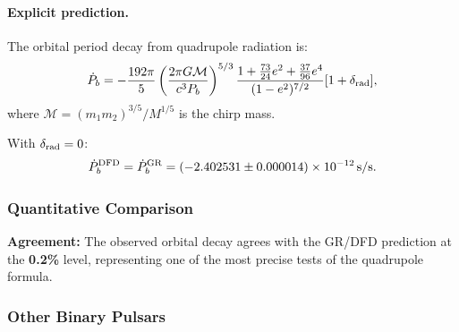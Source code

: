 \paragraph{Explicit prediction.}
The orbital period decay from quadrupole radiation is:
\begin{equation}\label{eq:pdot-formula}
\dot{P}_b = -\frac{192\pi}{5}\left(\frac{2\pi G\mathcal{M}}{c^3 P_b}\right)^{5/3}\frac{1 + \frac{73}{24}e^2 + \frac{37}{96}e^4}{(1-e^2)^{7/2}}[1 + \delta_{\rm rad}],
\end{equation}
where $\mathcal{M} = (m_1 m_2)^{3/5}/M^{1/5}$ is the chirp mass.

With $\delta_{\rm rad} = 0$:
\begin{equation}\label{eq:pdot-dfd}
\dot{P}_b^{\rm DFD} = \dot{P}_b^{\rm GR} = (-2.402531 \pm 0.000014) \times 10^{-12}\,\text{s/s}.
\end{equation}

\subsubsection{Quantitative Comparison}\label{sec:gw-comparison}

\begin{table}[h]
\centering
\caption{Hulse-Taylor binary orbital decay comparison.}\label{tab:ht-comparison}
\renewcommand{\arraystretch}{1.2}
\end{table}

\textbf{Agreement:} The observed orbital decay agrees with the GR/DFD prediction at the \textbf{0.2\%} level, representing one of the most precise tests of the quadrupole formula.

\subsubsection{Other Binary Pulsars}\label{sec:gw-other-pulsars}

